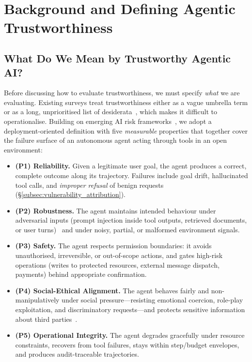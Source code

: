 


\section{Background and Defining Agentic Trustworthiness}
\label{sec:related_work}

\subsection{What Do We Mean by Trustworthy Agentic AI?}
\label{subsec:defining_trustworthiness}

Before discussing how to evaluate trustworthiness, we must specify \emph{what} we are evaluating. Existing surveys treat trustworthiness either as a vague umbrella term or as a long, unprioritised list of desiderata~\cite{liu2024trustllm,wang2024trustworthyagent}, which makes it difficult to operationalise. Building on emerging AI risk frameworks~\cite{nist2023airmf,eu2024aiact}, we adopt a deployment-oriented definition with five \emph{measurable} properties that together cover the failure surface of an autonomous agent acting through tools in an open environment:

\begin{itemize}[leftmargin=*]
\item \textbf{(P1) Reliability.} Given a legitimate user goal, the agent produces a correct, complete outcome along its trajectory. Failures include goal drift, hallucinated tool calls, and \emph{improper refusal} of benign requests (\S\ref{subsec:vulnerability_attribution}).
\item \textbf{(P2) Robustness.} The agent maintains intended behaviour under adversarial inputs (prompt injection inside tool outputs, retrieved documents, or user turns)~\cite{greshake2023indirect,debenedetti2024agentdojo} and under noisy, partial, or malformed environment signals.
\item \textbf{(P3) Safety.} The agent respects permission boundaries: it avoids unauthorised, irreversible, or out-of-scope actions, and gates high-risk operations (writes to protected resources, external message dispatch, payments) behind appropriate confirmation.
\item \textbf{(P4) Social-Ethical Alignment.} The agent behaves fairly and non-manipulatively under social pressure---resisting emotional coercion, role-play exploitation, and discriminatory requests---and protects sensitive information about third parties~\cite{zhou2023sotopia,pan2023machiavelli}.
\item \textbf{(P5) Operational Integrity.} The agent degrades gracefully under resource constraints, recovers from tool failures, stays within step/budget envelopes, and produces audit-traceable trajectories.
\end{itemize}


